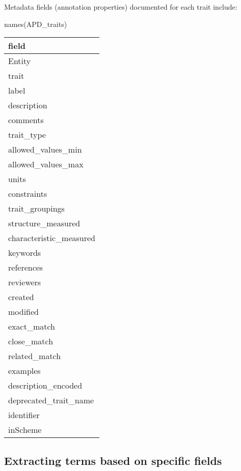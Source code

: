 \documentclass[
  letterpaper,
  DIV=11,
  numbers=noendperiod]{scrartcl}
\newenvironment{Shaded}{\begin{snugshade}}{\end{snugshade}}
\newcommand{\FunctionTok}[1]{\textcolor[rgb]{0.28,0.35,0.67}{#1}}
\newcommand{\NormalTok}[1]{\textcolor[rgb]{0.00,0.23,0.31}{#1}}
\begin{document}
\pagebreak

Metadata fields (annotation properties) documented for each trait
include:

\begin{Shaded}
\begin{Highlighting}[]
\FunctionTok{names}\NormalTok{(APD\_traits)}
\end{Highlighting}
\end{Shaded}

\begin{tabular}{l}
\toprule
field\\
\midrule
Entity\\
trait\\
label\\
description\\
comments\\
\addlinespace
trait\_type\\
allowed\_values\_min\\
allowed\_values\_max\\
units\\
constraints\\
\addlinespace
trait\_groupings\\
structure\_measured\\
characteristic\_measured\\
keywords\\
references\\
\addlinespace
reviewers\\
created\\
modified\\
exact\_match\\
close\_match\\
\addlinespace
related\_match\\
examples\\
description\_encoded\\
deprecated\_trait\_name\\
identifier\\
\addlinespace
inScheme\\
\bottomrule
\end{tabular}

\pagebreak

\hypertarget{extracting-terms-based-on-specific-fields}{%
\subsection{Extracting terms based on specific
fields}\label{extracting-terms-based-on-specific-fields}}
\end{document}
